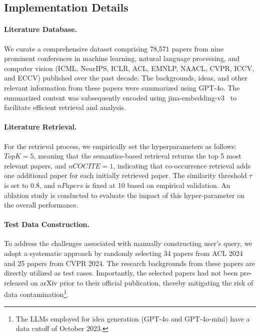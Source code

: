 \documentclass{article}
\theoremstyle{plain}
\theoremstyle{definition}
\theoremstyle{remark}
\begin{document}
\subsection{Implementation Details}

\paragraph{Literature Database.} We curate a comprehensive dataset comprising 78,571 papers from nine prominent conferences in machine learning, natural language processing, and computer vision (ICML, NeurIPS, ICLR, ACL, EMNLP, NAACL, CVPR, ICCV, and ECCV) published over the past decade. The backgrounds, ideas, and other relevant information from these papers were summarized using GPT-4o. The summarized content was subsequently encoded using jina-embedding-v3~\cite{DBLP:journals/corr/abs-2409-10173} to facilitate efficient retrieval and analysis.
\vspace{-2mm}
\paragraph{Literature Retrieval.} For the retrieval process, we empirically set the hyperparameters as follows: $TopK=5$, meaning that the semantics-based retrieval returns the top 5 most relevant papers, and $nCOCITE=1$, indicating that co-occurrence retrieval adds one additional paper for each initially retrieved paper. The similarity threshold $\tau$ is set to 0.8, and $nPapers$ is fixed at 10 based on empirical validation. An ablation study is conducted to evaluate the impact of this hyper-parameter on the overall performance.
\vspace{-2mm}
\paragraph{Test Data Construction.} To address the challenges associated with manually constructing user's query, we adopt a systematic approach by randomly selecting 34 papers from ACL 2024 and 25 papers from CVPR 2024. The research backgrounds from these papers are directly utilized as test cases. Importantly, the selected papers had not been pre-released on arXiv prior to their official publication, thereby mitigating the risk of data contamination\footnote{The LLMs employed for idea generation (GPT-4o and GPT-4o-mini) have a data cutoff of October 2023.}.
\vspace{-2mm}
\end{document}
